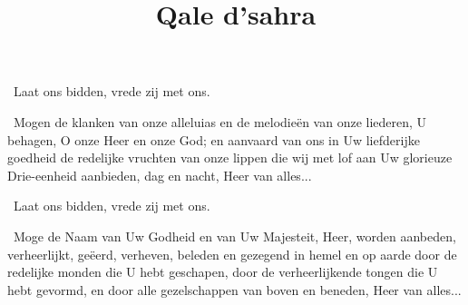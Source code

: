 \documentclass[12pt,twoside,a5paper]{article}
\begin{document}


\begin{halfparskip}
  \dd~Laat ons bidden, vrede zij met ons.

  \cc~Mogen de klanken van onze alleluias en de melodieën van onze liederen, U behagen, O onze Heer en onze God; en aanvaard van ons in Uw liefderijke goedheid de redelijke vruchten van onze lippen die wij met lof aan Uw glorieuze Drie-eenheid aanbieden, dag en nacht, Heer van alles...
\end{halfparskip}


\title{Qale d'sahra}
\inlinemaketitle



\begin{halfparskip}
  \dd~Laat ons bidden, vrede zij met ons.

  \cc~Moge de Naam van Uw Godheid en van Uw Majesteit, Heer, worden aanbeden, verheerlijkt, geëerd, verheven, beleden en gezegend in hemel en op aarde door de redelijke monden die U hebt geschapen, door de verheerlijkende tongen die U hebt gevormd, en door alle gezelschappen van boven en beneden, Heer van alles...
\end{halfparskip}


\end{document}
